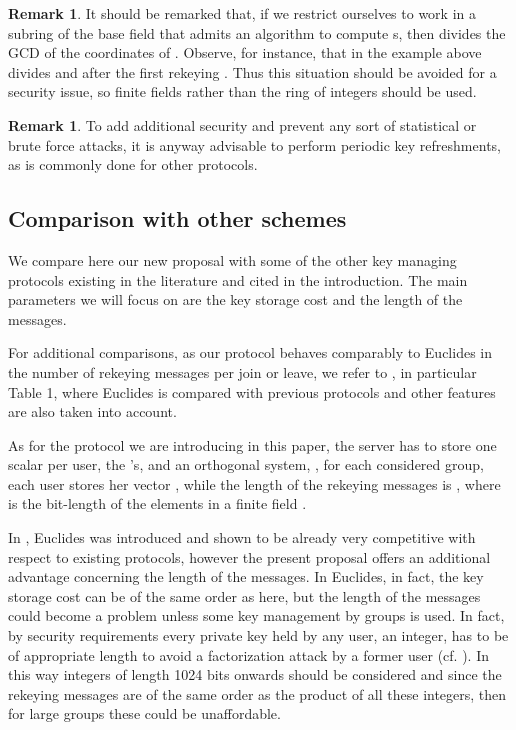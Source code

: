 \documentclass[a4paper,11pt]{amsart}
\theoremstyle{definition}
\newtheorem{remark}[theorem]{Remark}
\begin{document}
\begin{remark}
  It should be remarked that, if
  we restrict ourselves to work in a subring of the base field that
  admits an algorithm to compute s, then  divides the GCD of
  the coordinates of . Observe, for instance, that in the example above  divides
   and after the first rekeying . Thus
  this situation should be avoided for a security issue, so finite fields
  rather than the ring of integers should be
  used. \end{remark}

\begin{remark}
  To add additional security and prevent any sort of statistical or
  brute force attacks, it is anyway advisable to perform periodic key
  refreshments, as is commonly done for other
  protocols. \end{remark}

\subsection{Comparison with other schemes}

We compare here our new proposal with some of the other key managing
protocols existing in the literature and cited in the introduction.
The main parameters we will focus on are the key storage cost and the
length of the messages.

For additional comparisons, as our protocol behaves comparably to
Euclides in the number of rekeying messages per join or leave, we
refer to \cite{euclid}, in particular Table 1, where Euclides is
compared with previous protocols and other features are also taken
into account.

As for the protocol we are introducing in this paper,
the server has to store one scalar per user, the 's, and an
orthogonal system, , for each considered group, each user stores
her vector , while the length of the rekeying messages
is , where  is  the bit-length of the elements in a
finite field . 

In \cite{euclid}, Euclides was introduced and shown to be already very
competitive with respect to existing protocols, however the present
proposal offers an additional advantage concerning the length of the
messages. In Euclides, in fact, the key storage cost can be of the
same order as here, but the length of the messages could become a
problem unless some key management by groups is used. In fact, by
security requirements every private key held by any user, an integer,
has to be of appropriate length to avoid a factorization attack by a
former user (cf. \cite{euclid}). In this way integers of length 1024
bits onwards should be considered and since the rekeying messages are
of the same order as the product of all these integers, then for large
groups these could be unaffordable.
\end{document}
